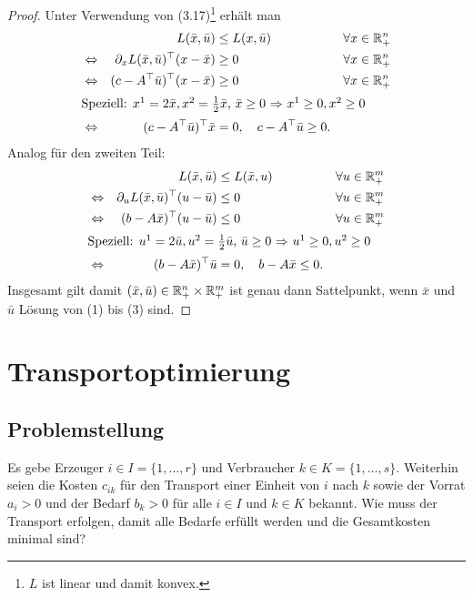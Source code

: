 \begin{proof}
  Unter Verwendung von (3.17)\footnote{$L$ ist linear und damit konvex.} erhält
  man 
  \begin{align*}
    &
    & L( \bar{x}, \bar{u} ) &\le L(x, \bar{u})
    & \forall x \in \mathbb{R}^n_+ \\
    &\Leftrightarrow
    & \partial_x L( \bar{x}, \bar{u})^\top (x-\bar{x}) &\ge 0
    & \forall x \in \mathbb{R}^n_+ \\
    &\Leftrightarrow
    & (c - A^\top \bar{u})^\top (x-\bar{x}) &\ge 0
    & \forall x \in \mathbb{R}^n_+ \\
    \intertext{Speziell: $x^1 = 2 \bar{x}, x^2 = \frac{1}{2} \bar{x}$,
    $\bar{x} \ge 0$ $\Rightarrow$ $x^1 \ge 0, x^2 \ge 0$}
    &\Leftrightarrow
    & (c - A^\top \bar{u})^\top \bar{x} &= 0, \quad c - A^\top \bar{u} \ge 0.
  \end{align*}
  Analog für den zweiten Teil:
  \begin{align*}
    &
    & L( \bar{x}, \bar{u} ) &\le L(\bar{x}, u)
    & \forall u \in \mathbb{R}^m_+ \\
    &\Leftrightarrow
    & \partial_u L( \bar{x}, \bar{u})^\top (u-\bar{u}) &\le 0
    & \forall u \in \mathbb{R}^m_+ \\
    &\Leftrightarrow
    & (b - A \bar{x})^\top (u-\bar{u}) &\le 0
    & \forall u \in \mathbb{R}^m_+ \\
    \intertext{Speziell: $u^1 = 2 \bar{u}, u^2 = \frac{1}{2} \bar{u}$,
    $\bar{u} \ge 0$ $\Rightarrow$ $u^1 \ge 0, u^2 \ge 0$}
    &\Leftrightarrow
    & (b - A \bar{x})^\top \bar{u} &= 0, \quad b - A \bar{x} \le 0.
  \end{align*}
  Insgesamt gilt damit $(\bar{x}, \bar{u}) \in \mathbb{R}^n_+ \times \mathbb{R}^m_+$ ist
  genau dann Sattelpunkt, wenn $\bar{x}$ und $\bar{u}$ Lösung von (1) bis (3)
  sind.
\end{proof}

\section{Transportoptimierung}
\subsection{Problemstellung}
Es gebe Erzeuger $i \in I = \{1, \ldots, r\}$ und Verbraucher $k \in K = \{1,
\ldots, s\}$. Weiterhin seien die Kosten $c_{ik}$ für den Transport einer
Einheit von $i$ nach $k$ sowie der Vorrat $a_i > 0$ und der Bedarf $b_k > 0$ für
alle $i \in I$ und $k \in K$ bekannt. Wie muss der Transport erfolgen, damit
alle Bedarfe erfüllt werden und die Gesamtkosten minimal sind?

